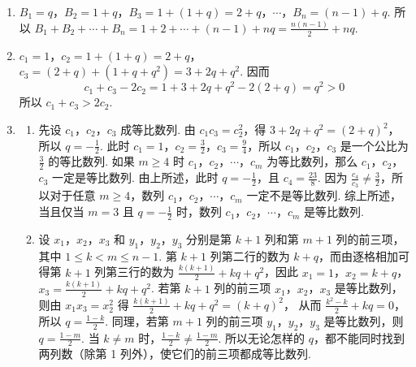 \begin{solution}
\begin{enumerate}
\item \(B_1=q\)，\(B_2=1+q\)，\(B_3=1+(1+q)=2+q\)，\(\cdots\)，\(B_n=(n-1)+q\). 所以 \(B_1+B_2+\cdots+B_n=1+2+\cdots+(n-1)+nq=\frac{n(n-1)}{2}+nq\).

\item \(c_1=1\)，\(c_2=1+(1+q)=2+q\)，\(c_3=(2+q)+(1+q+q^2)=3+2q+q^2\). 因而
\[
c_1+c_3-2c_2=1+3+2q+q^2-2(2+q)=q^2>0
\]
所以 \(c_1+c_3>2c_2\).

\item
\begin{enumerate}
\item 先设 \(c_1\)，\(c_2\)，\(c_3\) 成等比数列. 由 \(c_1c_3=c_2^2\)，得 \(3+2q+q^2=(2+q)^2\)，所以 \(q=-\frac{1}{2}\). 此时 \(c_1=1\)，\(c_2=\frac{3}{2}\)，\(c_3=\frac{9}{4}\)，所以 \(c_1\)，\(c_2\)，\(c_3\) 是一个公比为 \(\frac{3}{2}\) 的等比数列. 如果 \(m\geqslant4\) 时 \(c_1\)，\(c_2\)，\(\cdots\)，\(c_m\) 为等比数列，那么 \(c_1\)，\(c_2\)，\(c_3\) 一定是等比数列. 由上所述，此时 \(q=-\frac{1}{2}\)，且 \(c_4=\frac{23}{8}\). 因为 \(\frac{c_4}{c_3}\neq\frac{3}{2}\)，所以对于任意 \(m\geqslant4\)，数列 \(c_1\)，\(c_2\)，\(\cdots\)，\(c_m\) 一定不是等比数列. 综上所述，当且仅当 \(m=3\) 且 \(q=-\frac{1}{2}\) 时，数列 \(c_1\)，\(c_2\)，\(\cdots\)，\(c_m\) 是等比数列.

\item 设 \(x_1\)，\(x_2\)，\(x_3\) 和 \(y_1\)，\(y_2\)，\(y_3\) 分别是第 \(k+1\) 列和第 \(m+1\) 列的前三项，其中 \(1\leqslant k<m\leqslant n-1\). 第 \(k+1\) 列第二行的数为 \(k+q\)，而由逐格相加可得第 \(k+1\) 列第三行的数为 \(\frac{k(k+1)}{2}+kq+q^2\)，因此
\(x_1=1\)，\(x_2=k+q\)，\(x_3=\frac{k(k+1)}{2}+kq+q^2\).
若第 \(k+1\) 列的前三项 \(x_1\)，\(x_2\)，\(x_3\) 是等比数列，则由 \(x_1x_3=x_2^2\) 得 \(\frac{k(k+1)}{2}+kq+q^2=(k+q)^2\)，
从而 \(\frac{k^2-k}{2}+kq=0\)，所以 \(q=\frac{1-k}{2}\). 同理，若第 \(m+1\) 列的前三项 \(y_1\)，\(y_2\)，\(y_3\) 是等比数列，则 \(q=\frac{1-m}{2}\). 当 \(k\neq m\) 时，\(\frac{1-k}{2}\neq\frac{1-m}{2}\). 所以无论怎样的 \(q\)，都不能同时找到两列数（除第 1 列外），使它们的前三项都成等比数列.
\end{enumerate}
\end{enumerate}
\end{solution}
